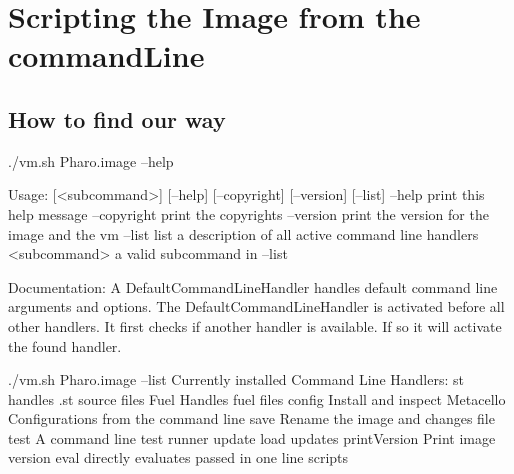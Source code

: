 \documentclass[a4paper,10pt,twoside]{book}
\begin{document}
\section{Scripting the Image from the commandLine}


\subsection{How to find our way}

\begin{code}{}
./vm.sh Pharo.image --help
\end{code}

\begin{code}{}
Usage: [<subcommand>] [--help] [--copyright] [--version] [--list]
	--help       print this help message
	--copyright  print the copyrights
	--version    print the version for the image and the vm
	--list       list a description of all active command line handlers
	<subcommand> a valid subcommand in --list
	
Documentation:
A DefaultCommandLineHandler handles default command line arguments and options.
The DefaultCommandLineHandler is activated before all other handlers. 
It first checks if another handler is available. If so it will activate the found handler.
\end{code}



\begin{code}{}
./vm.sh Pharo.image --list
Currently installed Command Line Handlers:
    st              handles .st source files
    Fuel            Handles fuel files
    config          Install and inspect Metacello Configurations from the command line
    save            Rename the image and changes file
    test            A command line test runner
    update          load updates
    printVersion    Print image version
    eval            directly evaluates passed in one line scripts
\end{code}    
    
\end{document}
